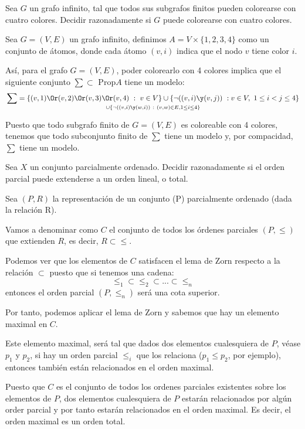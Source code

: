 \begin{problem}[4]
Sea $G$ un grafo infinito, tal que todos sus subgrafos finitos pueden colorearse con cuatro colores.
Decidir razonadamente si $G$ puede colorearse con cuatro colores.
\solution

Sea $G=(V,E)$ un grafo infinito, definimos $A=V \times \{1,2,3,4\}$ como un conjunto de átomos, donde cada átomo $(v,i)$ indica que el nodo $v$ tiene color $i$.

Así, para el grafo $G=(V,E)$, poder colorearlo con 4 colores implica que el siguiente conjunto $\sum \subset \text{ Prop} A$ tiene un modelo:
\[\sum = \{(v,1)\Or (v,2) \Or (v,3) \Or (v,4) \ : \ v \in V\} \cup \{\neg((v,i)\y(v,j)) \ : v \in V, \ 1 \leq i < j \leq 4\}\atop \cup \{\neg((v,i)\y (w,i)) \ : \ (v,w) \in E,  1 \leq i \leq 4\}\]

Puesto que todo subgrafo finito de $G=(V,E)$ es coloreable con 4 colores, tenemos que todo subconjunto finito de $\sum$ tiene un modelo y, por compacidad, $\sum$ tiene un modelo.

\end{problem}

\begin{problem}[5]
Sea $X$ un conjunto parcialmente ordenado. Decidir razonadamente si el orden parcial puede
extenderse a un orden lineal, o total.
\solution


Sea $(P,R)$ la representación de un conjunto (P) parcialmente ordenado (dada la relación R).

Vamos a denominar como $C$ el conjunto de todos los órdenes parciales $(P,\leq)$ que extienden $R$, es decir, $R \subset \leq$.

Podemos ver que los elementos de $C$ satisfacen el lema de Zorn respecto a la relación $\subset$ puesto que si tenemos una cadena:
\[\leq_1 \subset \leq_2 \subset ... \subset \leq_n\]
entonces el orden parcial $(P,\leq_n)$ será una cota superior.

Por tanto, podemos aplicar el lema de Zorn y sabemos que hay un elemento maximal en $C$.

Este elemento maximal, será tal que dados dos elementos cualesquiera de $P$, véase $p_1$ y $p_2$, si hay un orden parcial $\leq_i$ que los relaciona ($p_1 \leq p_2$, por ejemplo), entonces también están relacionados en el orden maximal.

Puesto que $C$ es el conjunto de todos los ordenes parciales existentes sobre los elementos de $P$, dos elementos cualesquiera de $P$ estarán relacionados por algún order parcial y por tanto estarán relacionados en el orden maximal. Es decir, el orden maximal es un orden total.
\end{problem}

